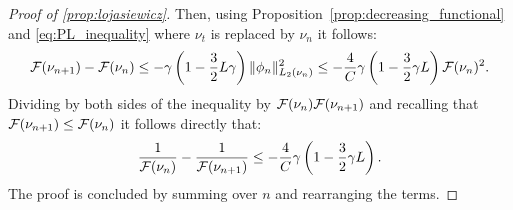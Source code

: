 \begin{proof}[Proof of \cref{prop:lojasiewicz}]
Then, using Proposition~\cref{prop:decreasing_functional} and \cref{eq:PL_inequality} where $\nu_t$ is replaced by $\nu_n$ it follows:
$$
{{\mathcal F}}(\nu_{n+1}) - {{\mathcal F}}(\nu_n) \leq -\gamma\left(1-\frac{3}{2} L\gamma\right)\|\phi_n\|_{L_2(\nu_n)}^2 \leq -\frac{4}{C}\gamma\left(1-\frac{3}{2}\gamma L\right){{\mathcal F}}(\nu_n)^2.
$$
Dividing by both sides of the inequality by  $ {{\mathcal F}}(\nu_n){{\mathcal F}}(\nu_{n+1})$ and recalling that ${{\mathcal F}}(\nu_{n+1})\leq {{\mathcal F}}(\nu_n)$ it follows directly that: 
$$\frac{1}{{{\mathcal F}}(\nu_n)} - \frac{1}{{{\mathcal F}}(\nu_{n+1})} \leq -\frac{4}{C}\gamma\left(1-\frac{3}{2}\gamma L\right).$$ The proof is concluded by summing over $n$ and rearranging the terms. 
\end{proof}






%


